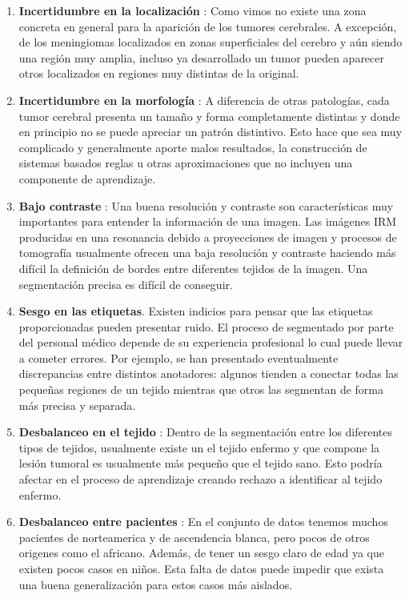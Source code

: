 \begin{enumerate}
	\item \textbf{Incertidumbre en la localización} : Como vimos no existe una zona concreta en general para la aparición de los tumores cerebrales. A excepción, de los meningiomas localizados en zonas superficiales del cerebro y aún siendo una región muy amplia, incluso ya desarrollado un tumor pueden aparecer otros localizados en regiones muy distintas de la original. 
	\item \textbf{Incertidumbre en la morfología} : A diferencia de otras patologías, cada tumor cerebral presenta un tamaño y forma completamente distintas y donde en principio no se puede apreciar un patrón distintivo. Esto hace que sea muy complicado y generalmente aporte malos resultados, la construcción de sistemas basados reglas u otras aproximaciones que no incluyen una componente de aprendizaje.
	
	\item \textbf{Bajo contraste} : Una buena resolución y contraste son características muy importantes para entender la información de una imagen. Las imágenes IRM producidas en una resonancia debido a proyecciones de imagen y procesos de tomografía usualmente ofrecen una baja resolución y contraste haciendo más difícil la definición de bordes entre diferentes tejidos de la imagen. Una segmentación precisa es difícil de conseguir.
	
	\item \textbf{Sesgo en las etiquetas}. Existen indicios para pensar que las etiquetas proporcionadas pueden presentar ruido. El proceso de segmentado por parte del personal médico 
	depende de su experiencia profesional lo cual puede llevar a cometer errores. Por ejemplo, se han presentado eventualmente discrepancias entre distintos anotadores: algunos tienden a conectar todas las pequeñas regiones de un tejido mientras que otros las segmentan de forma más precisa y separada. 
	
	\item \textbf{Desbalanceo en el tejido} : Dentro de la segmentación entre los diferentes tipos de tejidos, usualmente existe un el tejido enfermo y que compone la lesión tumoral es usualmente más pequeño que el tejido sano. Esto podría afectar en el proceso de aprendizaje creando rechazo a identificar al tejido enfermo. 
	
	\item \textbf{Desbalanceo entre pacientes} : En el conjunto de datos tenemos muchos pacientes de norteamerica y de ascendencia blanca, pero pocos de otros origenes como el africano. Además, de tener un sesgo claro de edad ya que existen pocos casos en niños. Esta falta de datos puede impedir que exista una buena generalización para estos casos más aislados.
	
\end{enumerate}


